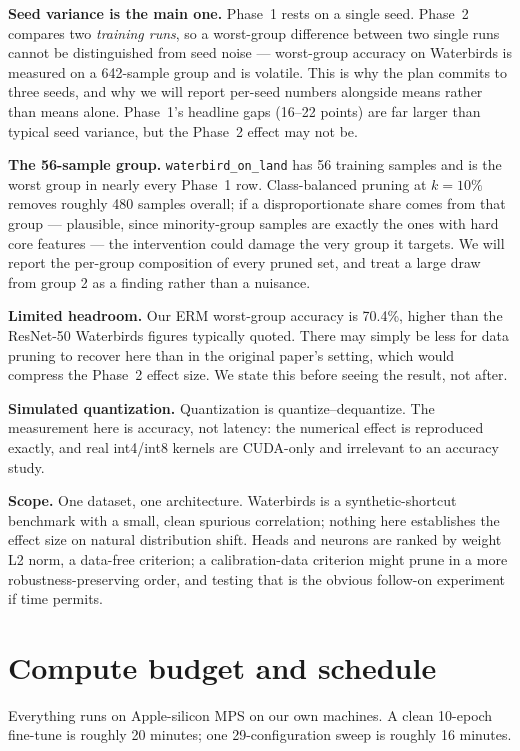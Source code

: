 \documentclass[11pt]{article}
\begin{document}
\textbf{Seed variance is the main one.} Phase~1 rests on a single seed. Phase~2
compares two \emph{training runs}, so a worst-group difference between two single
runs cannot be distinguished from seed noise --- worst-group accuracy on
Waterbirds is measured on a 642-sample group and is volatile. This is why the
plan commits to three seeds, and why we will report per-seed numbers alongside
means rather than means alone. Phase~1's headline gaps (16--22 points) are far
larger than typical seed variance, but the Phase~2 effect may not be.

\textbf{The 56-sample group.} \texttt{waterbird\_on\_land} has 56 training
samples and is the worst group in nearly every Phase~1 row. Class-balanced
pruning at $k=10\%$ removes roughly 480 samples overall; if a disproportionate
share comes from that group --- plausible, since minority-group samples are
exactly the ones with hard core features --- the intervention could damage the
very group it targets. We will report the per-group composition of every pruned
set, and treat a large draw from group 2 as a finding rather than a nuisance.

\textbf{Limited headroom.} Our ERM worst-group accuracy is 70.4\%, higher than
the ResNet-50 Waterbirds figures typically quoted. There may simply be less for
data pruning to recover here than in the original paper's setting, which would
compress the Phase~2 effect size. We state this before seeing the result, not
after.

\textbf{Simulated quantization.} Quantization is quantize--dequantize. The
measurement here is accuracy, not latency: the numerical effect is reproduced
exactly, and real int4/int8 kernels are CUDA-only and irrelevant to an accuracy
study.

\textbf{Scope.} One dataset, one architecture. Waterbirds is a synthetic-shortcut
benchmark with a small, clean spurious correlation; nothing here establishes the
effect size on natural distribution shift. Heads and neurons are ranked by weight
L2 norm, a data-free criterion; a calibration-data criterion might prune in a
more robustness-preserving order, and testing that is the obvious follow-on
experiment if time permits.

\section{Compute budget and schedule}

Everything runs on Apple-silicon MPS on our own machines. A clean 10-epoch
fine-tune is roughly 20 minutes; one 29-configuration sweep is roughly 16
minutes.
\end{document}
